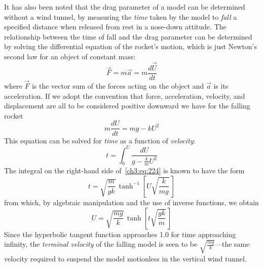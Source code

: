 It has also been noted that the drag parameter of a model can be determined
without a wind tunnel, by measuring the \emph{time} taken by the model to
\emph{fall} a specified distance when released from rest in a nose-down
attitude. The relationship between the time of fall and the drag parameter can
be determined by solving the differential equation of the rocket's motion,
which is just Newton's second law for an object of constant mass:
\begin{equation}\label{ch3:eq:222}
\vec{F} = m\vec{a} = m\frac{d\vec{U}}{dt}
\end{equation}
where $\vec{F}$ is the vector sum of the forces acting on the object and
$\vec{a}$ is its acceleration. If we adopt the convention that force,
acceleration, velocity, and displacement are all to be considered positive
downward we have for the falling rocket
\begin{equation}\label{ch3:eq:223}
m\frac{dU}{dt} = mg - kU^{2}
\end{equation}
This equation can be solved for \emph{time} as a function of \emph{velocity}:
\begin{equation}\label{ch3:eq:224}
t = \int_{0}^{U}\frac{dU}{g - \frac{k}{m}U^{2}}
\end{equation}
The integral on the right-hand side of~\eqref{ch3:eq:224} is known to have the
form
\begin{equation}\label{ch3:eq:225}
t = \sqrt{\frac{m}{gk}}\,\tanh^{-1}\left[U\sqrt{\frac{k}{mg}}\,\right]
\end{equation}
from which, by algebraic manipulation and the use of inverse functions, we
obtain
\begin{equation}\label{ch3:eq:226}
U = \sqrt{\frac{mg}{k}}\,\tanh\left[t\sqrt{\frac{gk}{m}}\,\right]
\end{equation}
Since the hyperbolic tangent function approaches 1.0 for time approaching
infinity, the \emph{terminal velocity} of the falling model is seen to be
$\sqrt{\frac{mg}{k}}$---the same velocity required to suspend the model
motionless in the vertical wind tunnel.

